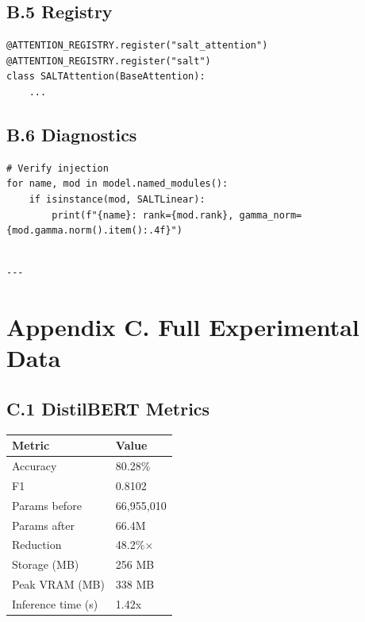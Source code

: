 \subsection{B.5 Registry}

\begin{lstlisting}
@ATTENTION_REGISTRY.register("salt_attention")
@ATTENTION_REGISTRY.register("salt")
class SALTAttention(BaseAttention):
    ...
\end{lstlisting}

\subsection{B.6 Diagnostics}

\begin{lstlisting}
# Verify injection
for name, mod in model.named_modules():
    if isinstance(mod, SALTLinear):
        print(f"{name}: rank={mod.rank}, gamma_norm={mod.gamma.norm().item():.4f}")
\end{lstlisting}
\begin{lstlisting}

---
\end{lstlisting}


\section{Appendix C. Full Experimental Data}

\subsection{C.1 DistilBERT Metrics}

\begin{table}[H]
\centering
\small
\begin{tabular}{ll}
\toprule
\textbf{Metric} & \textbf{Value} \\
\midrule
Accuracy & 80.28\% \\
F1 & 0.8102 \\
Params before & 66,955,010 \\
Params after & 66.4M \\
Reduction & 48.2\%$\times$ \\
Storage (MB) & 256 MB \\
Peak VRAM (MB) & 338 MB \\
Inference time (s) & 1.42x \\
\bottomrule
\end{tabular}
\end{table}

